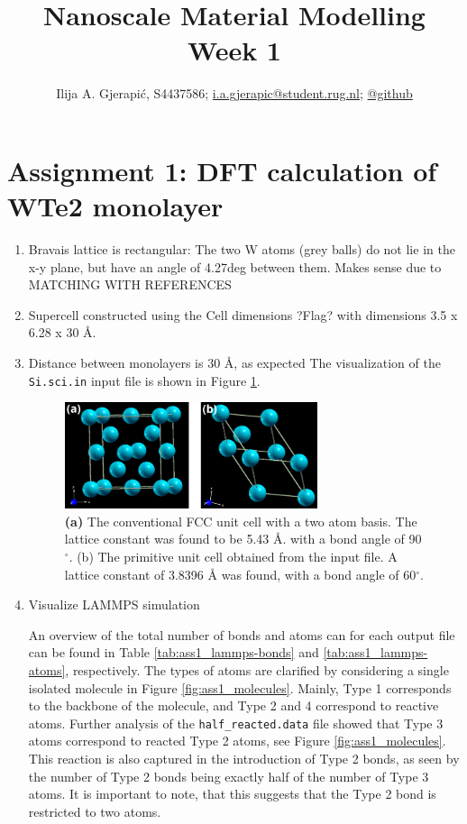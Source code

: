 \documentclass[10pt,a4paper]{labreport}
\title{Nanoscale Material Modelling
\\
\normalsize{Week 1}} %
\author{Ilija A. Gjerapić, S4437586; \href{mailto:i.a.gjerapic@student.rug.nl}{i.a.gjerapic@student.rug.nl}; \href{https://github.com/igjerapic/nmm-week1/}{@github} } %
\begin{document}
\maketitle



  

\thispagestyle{firststyle}
\newpage
\section{Assignment 1: DFT calculation of WTe2 monolayer}
\begin{enumerate}
  \item Bravais lattice is rectangular: The two W atoms (grey balls) do not lie in the x-y plane, but have an angle of 4.27deg between them. Makes sense due to {\color{red} MATCHING WITH REFERENCES}
  
  \item Supercell constructed using the Cell dimensions ?Flag? with dimensions 3.5 x 6.28 x 30 \AA. 
  \item Distance between monolayers is 30 \AA, as expected 
  The visualization of the \texttt{Si.sci.in} input file is shown in Figure \ref{fig:ass1_cryst}. 
  \begin{figure}[h]
    \centering 
    \includegraphics[width = 0.7\textwidth]{figs/ass1_Si_cryst.png}
    \caption{\textbf{(a)} The conventional FCC unit cell with a two atom basis. The lattice constant was found to be 5.43 \AA. with a bond angle of 90$^\circ$. (b) The primitive unit cell obtained from the input file. A lattice constant of 3.8396 {\AA} was found, with a bond angle of 60$^\circ$.}
    \label{fig:ass1_cryst}
  \end{figure}

  \item Visualize LAMMPS simulation 
  
  An overview of the total number of bonds and atoms can for each output file can be found in Table \ref{tab:ass1_lammps-bonds} and \ref{tab:ass1_lammps-atoms}, respectively.
  The types of atoms are clarified by considering a single isolated molecule in Figure \ref{fig:ass1_molecules}. Mainly, Type 1 corresponds to the backbone of the molecule, and Type 2 and 4 correspond to reactive atoms. Further analysis of the \texttt{half\_reacted.data} file showed that Type 3 atoms correspond to reacted Type 2 atoms, see Figure \ref{fig:ass1_molecules}. This reaction is also captured in the introduction of Type 2 bonds, as seen by the number of Type 2 bonds being exactly half of the number of Type 3 atoms. It is important to note, that this suggests that the Type 2 bond is restricted to two atoms. 


\end{enumerate}
\end{document}
